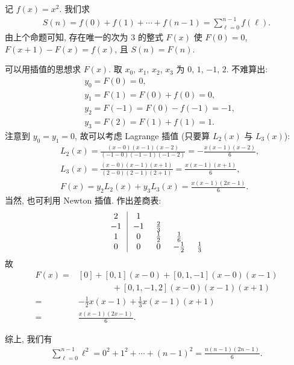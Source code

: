 \begin{example}
    记 $f(x) = x^2$. 我们求
    \begin{align*}
        S(n) = f(0) + f(1) + \cdots + f(n-1) = \sum_{\ell = 0}^{n - 1} f(\ell).
    \end{align*}
    由上个命题可知, 存在唯一的次为 $3$ 的整式 $F(x)$ 使 $F(0) = 0$, $F(x + 1) - F(x) = f(x)$, 且 $S(n) = F(n)$.

    可以用插值的思想求 $F(x)$. 取 $x_0$, $x_1$, $x_2$, $x_3$ 为 $0$, $1$, $-1$, $2$. 不难算出:
    \begin{align*}
         & y_{0} = F(0) = 0,                  \\
         & y_{1} = F(1) = F(0) + f(0) = 0,    \\
         & y_{2} = F(-1) = F(0) - f(-1) = -1, \\
         & y_{3} = F(2) = F(1) + f(1) = 1.
    \end{align*}
    注意到 $y_0 = y_1 = 0$, 故可以考虑 Lagrange 插值 (只要算 $L_2 (x)$ 与 $L_3 (x)$):
    \begin{align*}
         & L_2 (x) = \frac{(x - 0)(x - 1)(x - 2)}{(-1 - 0)(-1 - 1)(-1 - 2)} = -\frac{x(x-1)(x-2)}{6}, \\
         & L_3 (x) = \frac{(x - 0)(x - 1)(x + 1)}{(2 - 0)(2 - 1)(2 + 1)} = \frac{x(x-1)(x+1)}{6},     \\
         & F(x) = y_2 L_2 (x) + y_3 L_3 (x) = \frac{x(x-1)(2x-1)}{6}.
    \end{align*}
    当然, 也可利用 Newton 插值. 作出差商表:
    \begin{align*}
        \arraycolsep=0.25cm
        \begin{array}{c|cccc}
            2  & 1  & \       & \        & \       \\
            -1 & -1 & \frac23 & \        & \       \\
            1  & 0  & \frac12 & \frac16  & \       \\
            0  & 0  & 0       & -\frac12 & \frac13 \\
        \end{array}
    \end{align*}
    故
    \begin{align*}
        F(x)
        = {} & [0] + [0,1] (x - 0) + [0,1,-1] (x - 0)(x - 1)    \\
             & \qquad \qquad + [0,1,-1,2] (x - 0)(x - 1)(x + 1) \\
        = {} & -\frac{1}{2} x(x-1) + \frac{1}{3} x(x-1)(x+1)    \\
        = {} & \frac{x(x-1)(2x-1)}{6}.
    \end{align*}

    综上, 我们有
    \begin{align*}
        \sum_{\ell = 0}^{n - 1} \ell^2 = 0^2 + 1^2 + \cdots + (n-1)^2 = \frac{n(n-1)(2n-1)}{6}.
    \end{align*}
\end{example}

